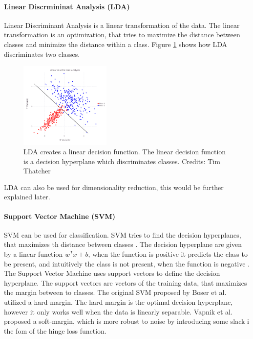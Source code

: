 \paragraph{Linear Discrmininat Analysis (LDA)}

Linear Discriminant Analysis is a linear transformation of the data. The linear transformation is an optimization, that tries to maximize the distance between classes and minimize the distance within a class\cite{AIML}. Figure \ref{fig:lda_dec} shows how LDA discriminates two classes.

\begin{figure}[H]
    \centering
    \includegraphics[width=0.4\textwidth]{figures/lda_deci.png}
    \caption[]{LDA creates a linear decision function. The linear decision function is a decision hyperplane which discriminates classes. Credits: Tim Thatcher}
    \label{fig:lda_dec}
\end{figure}

LDA can also be used for dimensionality reduction, this would be further explained later.

\paragraph{Support Vector Machine (SVM)}

SVM can be used for classification. SVM tries to find the decision hyperplanes, that maximizes th distance between classes \cite{IR}. The decision hyperplane are given by a linear function $w^Tx+b$, when the function is positive it predicts the class to be present, and intuitively the class is not present, when the function is negative \cite{Goodfellow-et-al-2016}. The Support Vector Machine uses support vectors to define the decision hyperplane. The support vectors are vectors of the training data, that maximizes the margin between to classes. The original SVM proposed by Boser et al. \cite{Boser} utilized a hard-margin. The hard-margin is the optimal decision hyperplane, however it only works well when the data is linearly separable. Vapnik et al. \cite{Vapnik} proposed a soft-margin, which is more robust to noise by introducing some slack i the fom of the hinge loss function.


